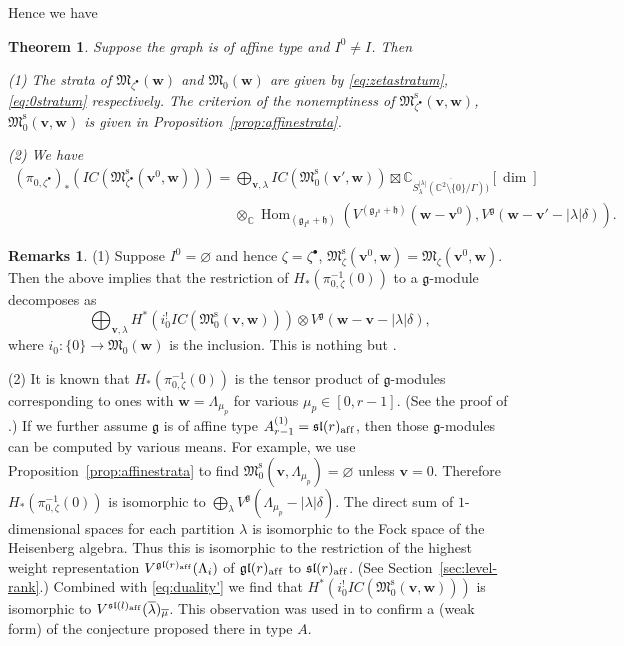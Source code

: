 \documentclass[pdftex]{sigma}
\newtheorem{Theorem}[equation]{Theorem}
\theoremstyle{definition}
\newtheorem{Remarks}[equation]{Remarks}
\numberwithin{equation}{section}
\newcommand{\secref}[1]{Section~\ref{#1}}
\newcommand{\propref}[1]{Proposition~\ref{#1}}
\newcommand{\C}{{\mathbb C}}
\newcommand{\algsl}{\operatorname{\mathfrak{sl}}} %
\newcommand{\gl}{\operatorname{\mathfrak{gl}}}
\newcommand{\g}{{\mathfrak g}}
\newcommand{\Hom}{\operatorname{Hom}}
\newcommand{\M}{{\mathfrak M}} %
\newcommand{\Mreg}{\M^{\operatorname{s}}}
\newcommand{\bv}{{\mathbf v}} %
\newcommand{\bw}{{\mathbf w}} %
\newcommand{\aff}{\mathrm{af\/f}}
\begin{document}
Hence we have
\begin{Theorem}
Suppose the graph is of affine type and $I^0\neq I$. Then

\textup{(1)} The strata of $\M_{\zeta^\bullet}(\bw)$ and $\M_0(\bw)$
are given by \eqref{eq:zetastratum}, \eqref{eq:0stratum} respectively.
The criterion of the nonemptiness of $\Mreg_{\zeta^\bullet}(\bv,\bw)$,
$\Mreg_0(\bv,\bw)$ is given in Proposition~{\rm \ref{prop:affinestrata}}.

\textup{(2)} We have
\begin{gather*}
  (\pi_{0,\zeta^\bullet})_*(IC(\Mreg_{\zeta^\bullet}(\bv^0,\bw)))
 =
   \bigoplus_{\bv,\lambda}
  IC(\Mreg_0(\bv',\bw)) \boxtimes
\C_{\overline{S^{|\lambda|}_\lambda(\C^2\setminus\{0\}/\Gamma))}}[\dim]
\\
\phantom{(\pi_{0,\zeta^\bullet})_*(IC(\Mreg_{\zeta^\bullet}(\bv^0,\bw)))=}{} \otimes_\C
  \Hom_{(\g_{I^0}+\mathfrak h)}
  (V^{(\g_{I^0}+\mathfrak h)}(\bw - \bv^0), V^\g(\bw-\bv'-|\lambda|\delta)).
\end{gather*}
\end{Theorem}

\begin{Remarks}\label{rem:check}
(1) Suppose $I^0=\varnothing$ and hence $\zeta = \zeta^\bullet$,
$\Mreg_{\zeta}(\bv^0,\bw) = \M_{\zeta}(\bv^0,\bw)$.
%
Then the above implies that the restriction of
$H_*(\pi_{0,\zeta}^{-1}(0))$ to a $\g$-module decomposes as
\begin{equation*}
  \bigoplus_{\bv,\lambda}
  H^*(i_0^! IC(\Mreg_0(\bv,\bw))) \otimes V^\g(\bw-\bv-|\lambda|\delta),
\end{equation*}
where $i_0\colon\{0\}\to \M_0(\bw)$ is the inclusion. This is nothing
but \cite[Theorem~5.2]{MR1989196}.

(2) It is known that $H_*(\pi_{0,\zeta}^{-1}(0))$ is the tensor
product of $\g$-modules corresponding to ones with $\bw = \Lambda_{\mu_p}$
for various $\mu_p\in [0,r-1]$. (See the proof of
\cite[14.1.2]{Na-qaff}.) If we
further assume $\g$ is of af\/f\/ine type $A_{r-1}^{(1)} =
\algsl(r)_\aff$, then those $\g$-modules can be computed by various
means. For example, we use \propref{prop:affinestrata} to f\/ind
$\Mreg_0(\bv,\Lambda_{\mu_p}) = \varnothing$ unless $\bv=0$. Therefore
$H_*(\pi_{0,\zeta}^{-1}(0))$ is isomorphic to
\(
   \bigoplus_\lambda V^\g(\Lambda_{\mu_p}-|\lambda|\delta).
\)
The direct sum of $1$-dimensional spaces for each partition $\lambda$
is isomorphic to the Fock space of the Heisenberg algebra. Thus this
is isomorphic to the restriction of the highest weight representation
$V^{\gl(r)_\aff}(\Lambda_i)$ of $\gl(r)_\aff$ to $\algsl(r)_\aff$.
(See \secref{sec:level-rank}.) Combined with \eqref{eq:duality'} we
f\/ind that $H^*(i_0^! IC(\Mreg_0(\bv,\bw)))$ is isomorphic to
$V^{\algsl(l)_\aff}(\overline\lambda)_{\overline\mu}$. This
observation was used in \cite{braverman-2007} to conf\/irm a (weak form)
of the conjecture proposed there in type $A$.
\end{Remarks}
\end{document}
